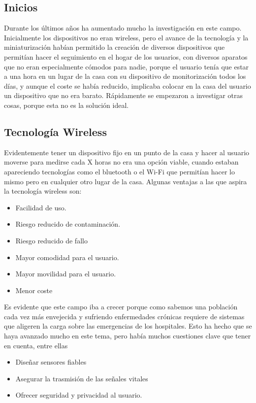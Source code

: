 \documentclass[12pt]{article}
\numberwithin{equation}{section}
\begin{document}
\subsection{Inicios}
Durante los últimos años ha aumentado mucho la investigación en este campo. Inicialmente los dispositivos no eran wireless, pero el avance de la tecnología y la miniaturización habían permitido la creación de diversos dispositivos que permitían hacer el seguimiento en el hogar de los usuarios, con diversos aparatos que no eran especialmente cómodos para nadie, porque el usuario tenía que estar a una hora en un lugar de la casa con su dispositivo de monitorización todos los días, y aunque el coste se había reducido, implicaba colocar en la casa del usuario un dispositivo que no era barato. Rápidamente se empezaron a investigar otras cosas, porque esta no es la solución ideal.  

\subsection{Tecnología Wireless}

Evidentemente tener un dispositivo fijo en un punto de la casa y hacer al usuario moverse para medirse cada X horas no era una opción viable, cuando estaban apareciendo tecnologías como el bluetooth o el Wi-Fi que permitían hacer lo mismo pero en cualquier otro lugar de la casa. Algunas ventajas a las que aspira\cite{1530994} la tecnología wireless son:

\begin{itemize}
\item Facilidad de uso.
\item Riesgo reducido de contaminación.
\item Riesgo reducido de fallo
\item Mayor comodidad para el usuario.
\item Mayor movilidad para el usuario.
\item Menor coste
\end{itemize}

Es evidente que este campo iba a crecer porque como  sabemos una población cada vez más envejecida y sufriendo enfermedades crónicas requiere de sistemas que aligeren la carga sobre las emergencias de los hospitales. Esto ha hecho que se haya avanzado mucho en este tema, pero había muchos cuestiones clave que tener en cuenta, entre ellas

\begin{itemize}
\item Diseñar sensores fiables
\item Asegurar la trasmisión de las señales vitales
\item Ofrecer seguridad y privacidad al usuario.
\end{itemize}
\end{document}
